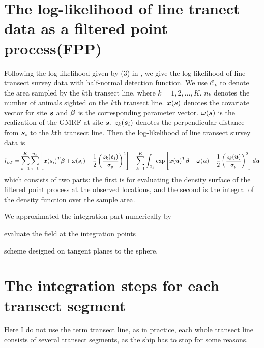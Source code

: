 \documentclass[a4paper]{article}\usepackage[]{graphicx}\usepackage[]{color}
\newcommand{\plab}[1]{\protect\label{#1}}
\newcommand{\be}{\begin{eqnarray}}
\newcommand{\bes}{\begin{eqnarray*}}
\newcommand{\ee}{\end{eqnarray}}
\newcommand{\ees}{\end{eqnarray*}}
\newcommand{\bm}[1]{\mbox{\boldmath $#1$}}
\begin{document}
\section{The log-likelihood of line tranect data as a filtered point process(FPP)}
Following the log-likelihood given by (3) in \citet{Johnson+al:2010}, we give the log-likelihood of line transect survey data with half-normal detection function. 
We use $\mathcal{C}_k$ to denote the area sampled by the $k$th transect line, where $k=1, 2, \ldots, K$. $n_k$ denotes the number of animals sighted on the $k$th transect line. $ \bm{x}(\bm{s})$ denotes the covariate vector for site $\bm{s}$ and $\bm{\beta}$ is the corresponding parameter vector. $\omega(\bm{s})$ is the realization of the GMRF at site $\bm{s}$. $z_k(\bm{s}_i)$ denotes the perpendicular distance from $\bm{s}_i$ to the $k$th transect line. Then the log-likelihood of line transect survey data is 
\be
l_{LT}= \sum_{k=1}^K\sum_{i=1}^{n_k} \left[  \bm{x}(\bm{s}_i) ^T \bm{\beta} +\omega(\bm{s}_i)  -\frac{1}{2}\left(\frac{z_k(\bm{s}_i)}{\sigma_g} \right)^2\right] - \sum_{k=1}^K\int_{\mathcal{C}_k}\exp\left[\bm{x}(\bm{u})^T \bm{\beta} +\omega(\bm{u})  -\frac{1}{2}\left(\frac{z_k(\bm{u})}{\sigma_g} \right)^ 2\right] d \bm{u}
\plab{eq:filterPPP}
\ee
which consists of two parts: the first is for evaluating the density surface of the filtered point process at the observed locations, and the second is the integral of the density function over the sample area. 





We approximated the integration part numerically by 

  evaluate the field at the integration points

scheme designed on tangent planes to the sphere. 




\section{The integration steps for each transect segment}
Here I do not use the term transect line, as in practice, each whole transect line consists of several transect segments, as the ship has to stop for some reasons. 
\end{document}
